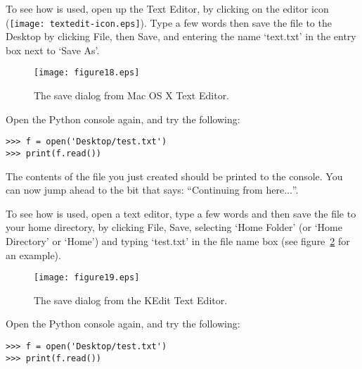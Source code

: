 \begin{MAC}
To see how  is used, open up the Text Editor, by clicking on the editor icon (\texttt{[image: textedit-icon.eps]}).  Type a few words then save the file to the Desktop by clicking File, then Save, and entering the name `text.txt' in the entry box next to `Save As'.

\begin{figure}
\begin{center}
\texttt{[image: figure18.eps]}
\end{center}
\caption{The save dialog from Mac OS X Text Editor.}\label{fig18}
\end{figure}

Open the Python console again, and try the following:

\begin{listing}
\begin{verbatim}
>>> f = open('Desktop/test.txt')
>>> print(f.read())
\end{verbatim}
\end{listing}

The contents of the file you just created should be printed to the console.  You can now jump ahead to the bit that says: ``Continuing from here$\ldots$''.
\end{MAC}

\begin{LINUX}
To see how  is used, open a text editor, type a few words and then save the file to your home directory, by clicking File, Save, selecting `Home Folder' (or `Home Directory' or `Home') and typing `test.txt' in the file name box (see figure~\ref{fig19} for an example).

\begin{figure}
\begin{center}
\texttt{[image: figure19.eps]}
\end{center}
\caption{The save dialog from the KEdit Text Editor.}\label{fig19}
\end{figure}

Open the Python console again, and try the following:

\begin{listing}
\begin{verbatim}
>>> f = open('Desktop/test.txt')
>>> print(f.read())
\end{verbatim}
\end{listing}

\end{LINUX}

